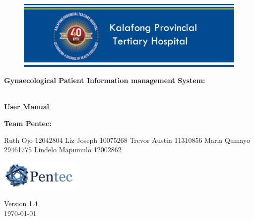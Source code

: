 \begin{titlepage}
	\begin{center}
		
		\begin{figure}[t]
			\centerline{
			\includegraphics[width=450px]{./Graphics/KPTH_Logo.png}}
		\end{figure}		
		
		\textbf{\LARGE Gynaecological Patient Information
		management System:}
		
		\vspace{1 cm}
	    \textbf{\LARGE \\User Manual}
		
		\vspace{1 cm}
		\LARGE{\textbf{Team Pentec: }}
		

		\begin{flushright} \large
			
			Ruth Ojo 12042804\newline
			Liz Joseph 10075268\newline
			Trevor Austin 11310856\newline
			Maria Qumayo 29461775\newline
			Lindelo Mapumulo 12002862\newline
		\end{flushright}
		
				\vspace{1 cm}
				\centering
				\includegraphics[width=150px]{./Graphics/Pentec_Logo.png}

		
		{\LARGE Version 1.4} 
		\\
		{\large \today}		
		
		
	\end{center}
\end{titlepage}
